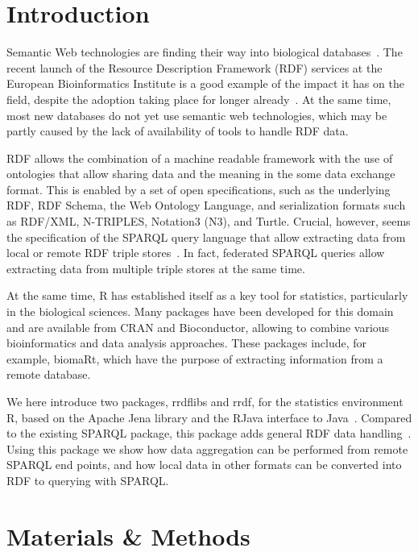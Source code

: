 \documentclass[12pt]{article}
\begin{document}
\section{Introduction}

Semantic Web technologies are finding their way into biological
databases~\cite{Belleau2008,Chen2010,Samwald2011,Williams2012,Willighagen2013}. The recent launch of the
Resource Description Framework (RDF) services at the European Bioinformatics Institute is a good example
of the impact it has on the field, despite the adoption taking place for longer already~\cite{EBIRDFPlatform}.
At the same time, most new databases do not yet use semantic web technologies, which may be partly
caused by the lack of availability of tools to handle RDF data.

RDF allows the combination of a machine readable framework with the use of ontologies that allow
sharing data and the meaning in the some data exchange format. This is enabled by a set of open
specifications, such as the underlying RDF, RDF Schema, the Web Ontology Language, and serialization formats
such as RDF/XML, N-TRIPLES, Notation3 (N3), and Turtle. Crucial, however, seems the specification of the SPARQL
query language that allow extracting data from local or remote RDF triple stores~\cite{Seaborne2009}. In fact,
federated SPARQL queries allow extracting data from multiple triple stores at the same time.

At the same time, R has established itself as a key tool for statistics, particularly in the biological
sciences. Many packages have been developed for this domain and are available from CRAN and Bioconductor,
allowing to combine various bioinformatics and data analysis approaches. These packages include,
for example, biomaRt, which have the purpose of extracting information from a remote database.

We here introduce two packages, rrdflibs and rrdf, for the statistics environment R, based on the Apache
Jena library and the RJava interface to Java~\cite{RMan,Jena,RJava}. Compared to the existing SPARQL
package, this package adds general RDF data handling~\cite{VanHage2013}. Using this package we show how
data aggregation can be performed from remote SPARQL end points, and how local data in other formats
can be converted into RDF to querying with SPARQL.

\section{Materials \& Methods}
\end{document}
